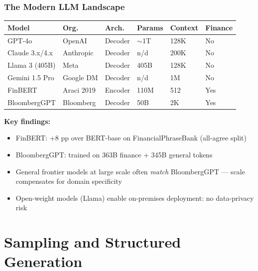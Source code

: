 \documentclass[9pt,t]{beamer}
\begin{document}
\begin{frame}
\frametitle{The Modern LLM Landscape}

\small
\begin{tabular}{llllll}
\toprule
\textbf{Model} & \textbf{Org.} & \textbf{Arch.} & \textbf{Params} & \textbf{Context} & \textbf{Finance} \\
\midrule
GPT-4o           & OpenAI      & Decoder & $\sim$1T  & 128K  & No \\
Claude 3.x/4.x   & Anthropic   & Decoder & n/d       & 200K  & No \\
Llama 3 (405B)   & Meta        & Decoder & 405B      & 128K  & No \\
Gemini 1.5 Pro   & Google DM   & Decoder & n/d       & 1M    & No \\
FinBERT          & Araci 2019  & Encoder & 110M      & 512   & Yes \\
BloombergGPT     & Bloomberg   & Decoder & 50B       & 2K    & Yes \\
\bottomrule
\end{tabular}

\normalsize
\medskip
\textbf{Key findings:}
\begin{itemize}
  \item FinBERT: +8 pp over BERT-base on FinancialPhraseBank (all-agree split)
  \item BloombergGPT: trained on 363B finance + 345B general tokens
  \item General frontier models at large scale often \emph{match} BloombergGPT --- scale compensates for domain specificity
  \item Open-weight models (Llama) enable on-premises deployment: no data-privacy risk
\end{itemize}
\end{frame}

\section{Sampling and Structured Generation}
\end{document}
